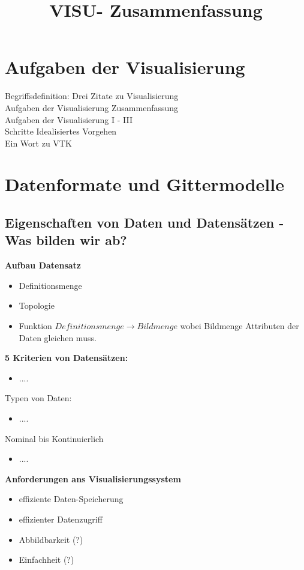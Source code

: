 \documentclass{article}
\title{\vspace{-5mm}%
	\fontsize{24pt}{10pt}\selectfont
	\textbf{VISU- Zusammenfassung}
}
\begin{document}
\maketitle	
\pagebreak
\section{Aufgaben der Visualisierung}
Begriffsdefinition: Drei Zitate zu Visualisierung\\
Aufgaben der Visualisierung Zusammenfassung\\
Aufgaben der Visualisierung I - III\\
Schritte Idealisiertes Vorgehen\\
Ein Wort zu VTK
\pagebreak

\section{Datenformate und Gittermodelle}
\subsection{Eigenschaften von Daten und Datensätzen - Was bilden wir ab?} 
\textbf{Aufbau Datensatz}\\

\begin{itemize}[noitemsep]
	\item Definitionsmenge
	\item Topologie
	\item Funktion $Definitionsmenge \rightarrow Bildmenge$ wobei Bildmenge Attributen der Daten gleichen muss.
\end{itemize}


\noindent \textbf{5 Kriterien von Datensätzen:}
\begin{itemize}[noitemsep]
	\item ....
\end{itemize}

\noindent Typen von Daten:
\begin{itemize}[noitemsep]
	\item ....
\end{itemize}
Nominal bis Kontinuierlich
\begin{itemize}[noitemsep]
	\item ....
\end{itemize}

\noindent \textbf{Anforderungen ans Visualisierungssystem}
\begin{itemize}[noitemsep]
	\item effiziente Daten-Speicherung
	\item effizienter Datenzugriff
	\item Abbildbarkeit (?)
	\item Einfachheit (?)
\end{itemize}
\end{document}
